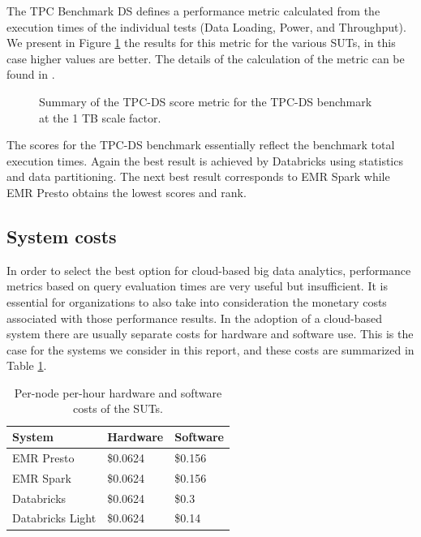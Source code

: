 The TPC Benchmark DS defines a performance metric calculated from the execution times of the individual tests (Data Loading, Power, and Throughput). We present in Figure \ref{fig:tpcdsMetricSummary} the results for this metric for the various SUTs, in this case higher values are better. The details of the calculation of the metric can be found in \cite{tpcdsSpec}.

\begin{figure}
   \begin{center}
   \end{center}
   \caption{Summary of the TPC-DS score metric for the TPC-DS benchmark at the 1 TB scale factor.}
   \label{fig:tpcdsMetricSummary}
\end{figure}

The scores for the TPC-DS benchmark essentially reflect the benchmark total execution times. Again the best result is achieved by Databricks using statistics and data partitioning. The next best result corresponds to EMR Spark while EMR Presto obtains the lowest scores and rank.

\subsection{System costs}\label{summarySystemCosts}

In order to select the best option for cloud-based big data analytics, performance metrics based on query evaluation times are very useful but insufficient. It is essential for organizations to also take into consideration the monetary costs associated with those performance results. In the adoption of a cloud-based system there are usually separate costs for hardware and software use. This is the case for the systems we consider in this report, and these costs are summarized in Table \ref{table:systemCosts}.

\begin{table}
  \centering
	\begin{tabular}{|l|l|l|}
	  \hline
		\textbf{System} & \textbf{Hardware} & \textbf{Software} \\ \hline
		EMR Presto & \$0.0624 & \$0.156 \\ \hline
		EMR Spark & \$0.0624 & \$0.156 \\ \hline
		Databricks & \$0.0624 & \$0.3 \\ \hline 
		Databricks Light & \$0.0624 & \$0.14 \\ \hline 
	\end{tabular}
	\caption{Per-node per-hour hardware and software costs of the SUTs.}
	\label{table:systemCosts}
\end{table}

